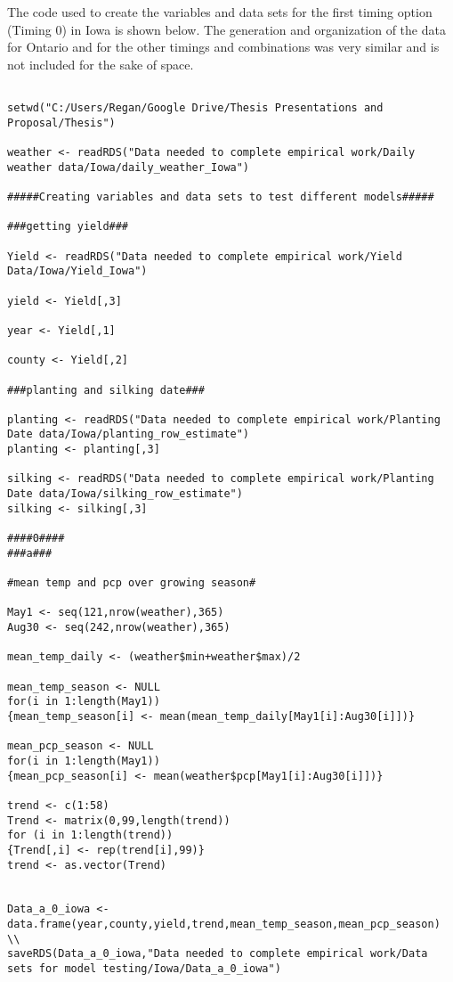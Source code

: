 The code used to create the variables and data sets for the first timing option (Timing 0) in Iowa is shown below. The generation and organization of the data for Ontario and for the other timings and combinations was very similar and is not included for the sake of space. 


\begin{lstlisting}

setwd("C:/Users/Regan/Google Drive/Thesis Presentations and Proposal/Thesis")

weather <- readRDS("Data needed to complete empirical work/Daily weather data/Iowa/daily_weather_Iowa")

#####Creating variables and data sets to test different models#####

###getting yield###

Yield <- readRDS("Data needed to complete empirical work/Yield Data/Iowa/Yield_Iowa")

yield <- Yield[,3]

year <- Yield[,1]

county <- Yield[,2]

###planting and silking date###

planting <- readRDS("Data needed to complete empirical work/Planting Date data/Iowa/planting_row_estimate")
planting <- planting[,3]

silking <- readRDS("Data needed to complete empirical work/Planting Date data/Iowa/silking_row_estimate")
silking <- silking[,3]

####0####
###a###

#mean temp and pcp over growing season#

May1 <- seq(121,nrow(weather),365)
Aug30 <- seq(242,nrow(weather),365)

mean_temp_daily <- (weather$min+weather$max)/2

mean_temp_season <- NULL
for(i in 1:length(May1))
{mean_temp_season[i] <- mean(mean_temp_daily[May1[i]:Aug30[i]])}

mean_pcp_season <- NULL
for(i in 1:length(May1))
{mean_pcp_season[i] <- mean(weather$pcp[May1[i]:Aug30[i]])}

trend <- c(1:58)
Trend <- matrix(0,99,length(trend))
for (i in 1:length(trend))
{Trend[,i] <- rep(trend[i],99)}
trend <- as.vector(Trend)


Data_a_0_iowa <- data.frame(year,county,yield,trend,mean_temp_season,mean_pcp_season)
\\
saveRDS(Data_a_0_iowa,"Data needed to complete empirical work/Data sets for model testing/Iowa/Data_a_0_iowa")


\end{lstlisting}
